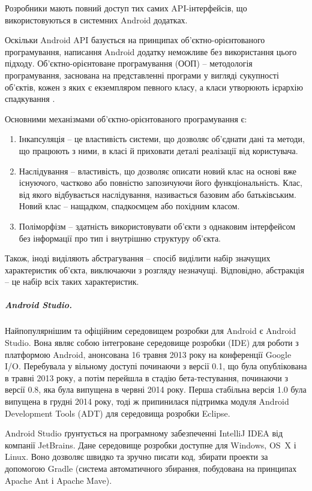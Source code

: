 \documentclass[../main.tex]{subfiles}
\begin{document}
Розробники мають повний доступ тих самих API-інтерфейсів, що використовуються в системних Android додатках.

Оскільки Android API базується на принципах об'єктно-орієнтованого програмування, написання Android додатку неможливе без використання цього підходу. Об'єктно-орієнтоване програмування (ООП) -- методологія програмування, заснована на представленні програми у вигляді сукупності об'єктів, кожен з яких є екземпляром певного класу, а класи утворюють ієрархію спадкування \cite{oop}.

Основними механізмами об'єктно-орієнтованого програмування є:
\begin{enumerate}
	\item Інкапсуляція -- це властивість системи, що дозволяє об'єднати дані та методи, що працюють з ними, в класі й приховати деталі реалізації від користувача.
	\item Наслідування -- властивість, що дозволяє описати новий клас на основі вже існуючого, частково або повністю запозичуючи його функціональність. Клас, від якого відбувається наслідування, називається базовим або батьківським. Новий клас -- нащадком, спадкоємцем або похідним класом.
	\item Поліморфізм -- здатність використовувати об'єкти з однаковим інтерфейсом без інформації про тип і внутрішню структуру об'єкта.
\end{enumerate}

Також, іноді виділяють абстрагування -- спосіб виділити набір значущих характеристик об'єкта, виключаючи з розгляду незначущі. Відповідно, абстракція -- це набір всіх таких характеристик.

\subparagraph{Android Studio.}
Найпопулярнішим та офіційним середовищем розробки для Android є Android Studio. Вона являє собою інтегроване середовище розробки (IDE) для роботи з платформою Android, анонсована 16 травня 2013 року на конференції Google I/O. Перебувала у вільному доступі починаючи з версії 0.1, що була опублікована в травні 2013 року, а потім перейшла в стадію бета-тестування, починаючи з версії 0.8, яка була випущена в червні 2014 року. Перша стабільна версія 1.0 була випущена в грудні 2014 року, тоді ж припинилася підтримка модуля Android Development Tools (ADT) для середовища розробки Eclipse.

Android Studio ґрунтується на програмному забезпеченні IntelliJ IDEA від компанії JetBrains. Дане середовище розробки доступне для Windows, OS~X і Linux. Воно дозволяє швидко та зручно писати код, збирати проекти за допомогою Gradle (система автоматичного збирання, побудована на принципах Apache Ant і Apache Mave).
\end{document}
